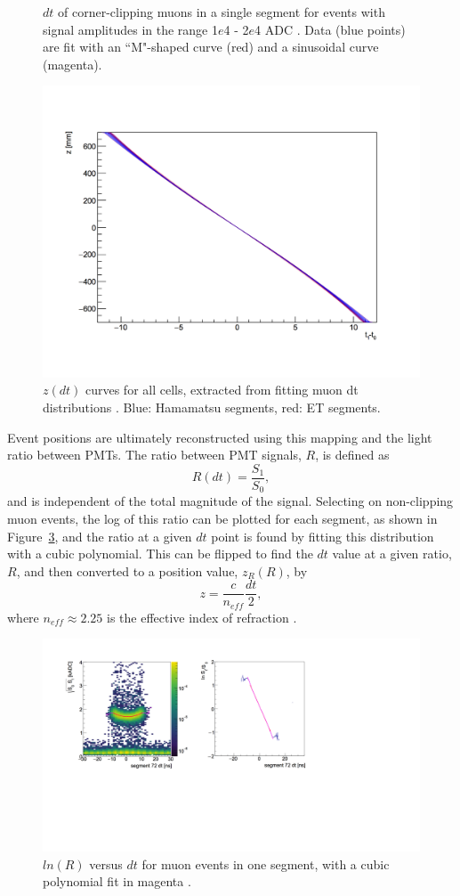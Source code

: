 \begin{figure}[h]
\begin{minipage}[h]{0.5\linewidth}
		\caption{$dt$ of corner-clipping muons in a single segment for events with signal amplitudes in the range  1$e$4 -  2$e$4 ADC \cite{MM:2314}. Data (blue points) are fit with an ``M"-shaped curve (red) and a sinusoidal curve (magenta).}
		\label{fig:hobbesfit}
	\end{minipage}
\end{figure}

\begin{figure}[H]
	\centering
	\includegraphics[width=0.45\linewidth]{tex/5-analysis-images/z_vs_dt}
	\caption{$z(dt)$ curves for all cells, extracted from fitting muon dt distributions \cite{MM:2314}. Blue: Hamamatsu segments, red: ET segments.}
	\label{fig:zvsdt}
\end{figure}

Event positions are ultimately reconstructed using this mapping and the light ratio between PMTs.  
The ratio between PMT signals, $R$, is defined as
\begin{equation}
	R(dt) = \frac{S_1}{S_0},
\end{equation}
and is independent of the total magnitude of the signal.
Selecting on non-clipping muon events, the log of this ratio can be plotted for each segment, as shown in Figure~\ref{fig:rvsdt}, and the ratio at a given $dt$ point is found by fitting this distribution with a cubic polynomial. 
This can be flipped to find the $dt$ value at a given ratio, $R$, and then converted to a position value, $z_R(R)$, by
\begin{equation}
	z = \frac{c}{n_{eff}}\frac{dt}{2},
	\label{eq:zdt}
\end{equation}
where $n_{eff} \approx 2.25$ is the effective index of refraction \cite{MM:2314}.

\begin{figure}[!t]
	\centering
	\includegraphics[width=0.5\linewidth]{tex/5-analysis-images/R_vs_dt}
	\caption{$ln(R)$ versus $dt$ for muon events in one segment, with a cubic polynomial fit in magenta \cite{MM:2314}.}
	\label{fig:rvsdt}
\end{figure}

